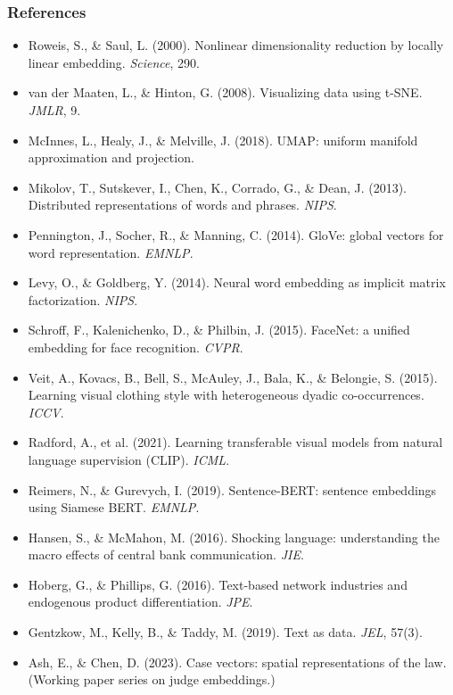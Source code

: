 \documentclass[notes,11pt, aspectratio=169]{beamer}
\begin{document}
\begin{frame}
\frametitle{References}

\footnotesize
\begin{itemize}
    \item Roweis, S., \& Saul, L. (2000). Nonlinear dimensionality reduction by locally linear embedding. \textit{Science}, 290.
    \item van der Maaten, L., \& Hinton, G. (2008). Visualizing data using t-SNE. \textit{JMLR}, 9.
    \item McInnes, L., Healy, J., \& Melville, J. (2018). UMAP: uniform manifold approximation and projection.
    \item Mikolov, T., Sutskever, I., Chen, K., Corrado, G., \& Dean, J. (2013). Distributed representations of words and phrases. \textit{NIPS}.
    \item Pennington, J., Socher, R., \& Manning, C. (2014). GloVe: global vectors for word representation. \textit{EMNLP}.
    \item Levy, O., \& Goldberg, Y. (2014). Neural word embedding as implicit matrix factorization. \textit{NIPS}.
    \item Schroff, F., Kalenichenko, D., \& Philbin, J. (2015). FaceNet: a unified embedding for face recognition. \textit{CVPR}.
    \item Veit, A., Kovacs, B., Bell, S., McAuley, J., Bala, K., \& Belongie, S. (2015). Learning visual clothing style with heterogeneous dyadic co-occurrences. \textit{ICCV}.
    \item Radford, A., et al. (2021). Learning transferable visual models from natural language supervision (CLIP). \textit{ICML}.
    \item Reimers, N., \& Gurevych, I. (2019). Sentence-BERT: sentence embeddings using Siamese BERT. \textit{EMNLP}.
    \item Hansen, S., \& McMahon, M. (2016). Shocking language: understanding the macro effects of central bank communication. \textit{JIE}.
    \item Hoberg, G., \& Phillips, G. (2016). Text-based network industries and endogenous product differentiation. \textit{JPE}.
    \item Gentzkow, M., Kelly, B., \& Taddy, M. (2019). Text as data. \textit{JEL}, 57(3).
    \item Ash, E., \& Chen, D. (2023). Case vectors: spatial representations of the law. (Working paper series on judge embeddings.)
\end{itemize}
\end{frame}
\end{document}
